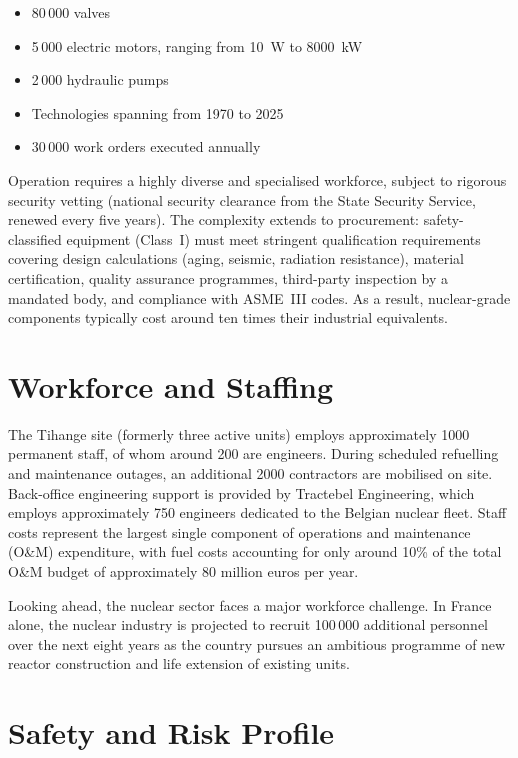 \begin{itemize}[noitemsep]
    \item 80\,000 valves
    \item 5\,000 electric motors, ranging from 10~W to 8000~kW
    \item 2\,000 hydraulic pumps
    \item Technologies spanning from 1970 to 2025
    \item 30\,000 work orders executed annually
\end{itemize}

Operation requires a highly diverse and specialised workforce, subject to rigorous security vetting (national security clearance from the State Security Service, renewed every five years). The complexity extends to procurement: safety-classified equipment (Class~I) must meet stringent qualification requirements covering design calculations (aging, seismic, radiation resistance), material certification, quality assurance programmes, third-party inspection by a mandated body, and compliance with ASME~III codes. As a result, nuclear-grade components typically cost around ten times their industrial equivalents.

\section{Workforce and Staffing}

The Tihange site (formerly three active units) employs approximately 1000 permanent staff, of whom around 200 are engineers. During scheduled refuelling and maintenance outages, an additional 2000 contractors are mobilised on site. Back-office engineering support is provided by Tractebel Engineering, which employs approximately 750 engineers dedicated to the Belgian nuclear fleet. Staff costs represent the largest single component of operations and maintenance (O\&M) expenditure, with fuel costs accounting for only around 10\% of the total O\&M budget of approximately 80 million euros per year.

Looking ahead, the nuclear sector faces a major workforce challenge. In France alone, the nuclear industry is projected to recruit 100\,000 additional personnel over the next eight years as the country pursues an ambitious programme of new reactor construction and life extension of existing units.

\section{Safety and Risk Profile}


